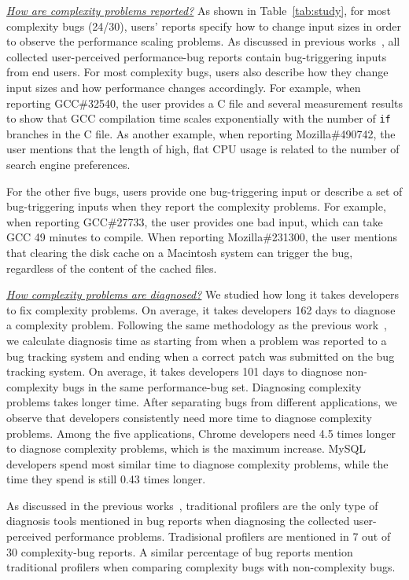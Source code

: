 {\underline{\textit{How are complexity problems reported?}}
As shown in Table~\ref{tab:study},
for most complexity bugs (24/30), 
users' reports specify how to change input sizes 
in order to observe the performance scaling problems. 
As discussed in previous works~\cite{SongOOPSLA2014}, 
all collected user-perceived performance-bug reports
contain bug-triggering inputs from end users. 
For most complexity bugs, 
users also describe how they change input sizes 
and how performance changes accordingly. 
For example, when reporting GCC\#32540, 
the user provides a C file and several measurement results to 
show that GCC compilation time scales exponentially 
with the number of \texttt{if} branches in the C file. 
As another example, when reporting Mozilla\#490742, 
the user mentions that the length of high, 
flat CPU usage is related to the number of search engine preferences. 


For the other five bugs, users provide one bug-triggering input 
or describe a set of bug-triggering inputs when they report the complexity problems. 
For example, when reporting GCC\#27733, 
the user provides one bad input, which can take GCC 49 minutes to compile. 
When reporting Mozilla\#231300, the user mentions 
that clearing the disk cache on a Macintosh system can trigger the bug, 
regardless of the content of the cached files. 


{\underline{\textit{How complexity problems are diagnosed?}}
We studied how long it takes developers to fix complexity problems. 
On average, it takes developers 162 days to diagnose a complexity problem. 
Following the same methodology as the previous work~\cite{SongOOPSLA2014},
we calculate diagnosis time as starting from when a problem 
was reported to a bug tracking system
and ending when a correct patch was submitted on the bug tracking system. 
On average, it takes developers 101 days to diagnose non-complexity bugs in the same performance-bug set. 
Diagnosing complexity problems takes longer time.
After separating bugs from different applications, 
we observe that developers consistently need more time to diagnose complexity problems.
Among the five applications, 
Chrome developers need 4.5 times longer to diagnose complexity problems,
which is the maximum increase.
MySQL developers spend most similar time to diagnose complexity problems,
while the time they spend is still 0.43 times longer. 

As discussed in the previous works~\cite{SongOOPSLA2014}, 
traditional profilers are the only type of diagnosis tools mentioned in bug reports 
when diagnosing the collected user-perceived performance problems. 
Tradisional profilers are mentioned in 7 out of 30 complexity-bug reports. 
A similar percentage of bug reports mention traditional profilers
when comparing complexity bugs with non-complexity bugs. 

}}
